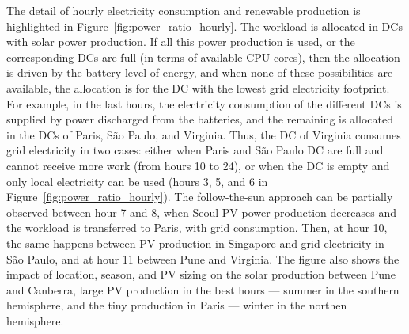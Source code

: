The detail of hourly electricity consumption and renewable production is highlighted in Figure~\ref{fig:power_ratio_hourly}.  The workload is allocated in DCs with solar power production. If all this power production is used, or the corresponding DCs are full (in terms of available CPU cores), then the allocation is driven by the battery level of energy, and when none of these possibilities are available, the allocation is for the DC with the lowest grid electricity footprint.  For example, in the last hours, the electricity consumption of the different DCs is supplied by power discharged from the batteries, and the remaining is allocated in the DCs of Paris, S\~ao Paulo, and Virginia. Thus, the DC of Virginia consumes grid electricity in two cases: either when Paris and S\~ao Paulo DC are full and cannot receive more work (from hours 10 to 24), or when the DC is empty and only local electricity can be used (hours 3, 5, and 6 in Figure~\ref{fig:power_ratio_hourly}). The follow-the-sun approach can be partially observed between hour 7 and 8, when Seoul PV power production decreases and the workload is transferred to Paris, with grid consumption.  Then, at hour 10, the same happens between PV production in Singapore and grid electricity in S\~ao Paulo, and at hour 11 between Pune and Virginia. The figure also shows the impact of location, season, and PV sizing on the solar production between Pune and Canberra, large PV production in the best hours --- summer in the southern hemisphere, and the tiny production in Paris --- winter in the northen hemisphere.

